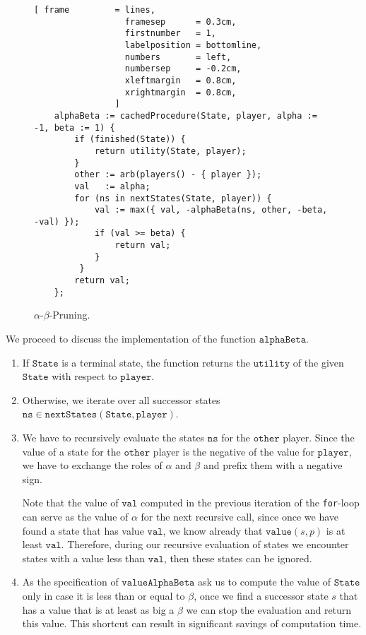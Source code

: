 \begin{figure}[!ht]
\centering
\begin{Verbatim}[ frame         = lines, 
                  framesep      = 0.3cm, 
                  firstnumber   = 1,
                  labelposition = bottomline,
                  numbers       = left,
                  numbersep     = -0.2cm,
                  xleftmargin   = 0.8cm,
                  xrightmargin  = 0.8cm,
                ]
    alphaBeta := cachedProcedure(State, player, alpha := -1, beta := 1) {
        if (finished(State)) {
            return utility(State, player);
        }
        other := arb(players() - { player });
        val   := alpha;
        for (ns in nextStates(State, player)) {
            val := max({ val, -alphaBeta(ns, other, -beta, -val) });
            if (val >= beta) {
                return val;
            }
         }
        return val;
    };
\end{Verbatim}
\vspace*{-0.3cm}
\caption{$\alpha$-$\beta$-Pruning.}
\label{fig:game-alpha-beta.stlx}
\end{figure}

We proceed to discuss the implementation of the function $\mathtt{alphaBeta}$.
\begin{enumerate}
\item If $\mathtt{State}$ is a terminal state, the function returns the $\mathtt{utility}$ of the given
      $\mathtt{State}$ with respect to $\mathtt{player}$.
\item Otherwise, we iterate over all successor states $\mathtt{ns} \in \mathtt{nextStates}(\mathtt{State}, \mathtt{player})$.
\item We have to recursively evaluate the states $\mathtt{ns}$ for the $\mathtt{other}$ player.
      Since the value of a state for the $\mathtt{other}$ player is the negative of the value for
      $\mathtt{player}$, we have to exchange the roles of $\alpha$ and $\beta$ and prefix them with a negative
      sign.

      Note that the value of $\mathtt{val}$ computed in the previous iteration of the \texttt{for}-loop 
      can serve as the value of $\alpha$ for the next recursive call, since once we have found a 
      state that has value $\mathtt{val}$, we know already that $\mathtt{value}(s,p)$ is at least
      $\mathtt{val}$.  Therefore, during our recursive evaluation of states we encounter states with a value
      less than $\mathtt{val}$, then these states can be ignored.
\item As the specification of $\mathtt{valueAlphaBeta}$ ask us to compute the value of $\mathtt{State}$ only in
      case it is less than or equal to $\beta$, once we find a successor state $s$ that has a
      value that is at least as big a $\beta$ we can stop the evaluation and return this value.
      This shortcut can result in significant savings of computation time.
\end{enumerate}


